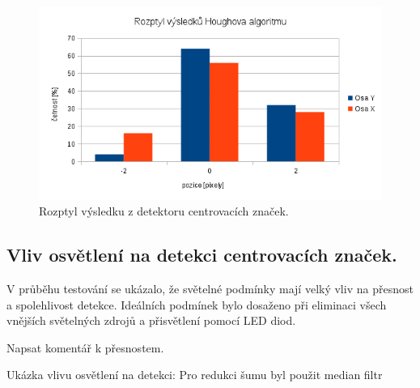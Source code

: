 \begin{figure}[h!]
  \centering
    \includegraphics[width=0.9\linewidth]{obrazky/houghGraph.png}%
    \caption{Rozptyl výsledku z detektoru centrovacích značek.}
    \label{fig:billateralfilter}
\end{figure}



\subsection{Vliv osvětlení na detekci centrovacích značek.}
V průběhu testování se ukázalo, že světelné podmínky mají velký vliv na přesnost a spolehlivost detekce. Ideálních podmínek bylo dosaženo při eliminaci všech vnějších světelných zdrojů a přisvětlení pomocí LED diod.

Napsat komentář k přesnostem.

Ukázka vlivu osvětlení na detekci: Pro redukci šumu byl použit median filtr


